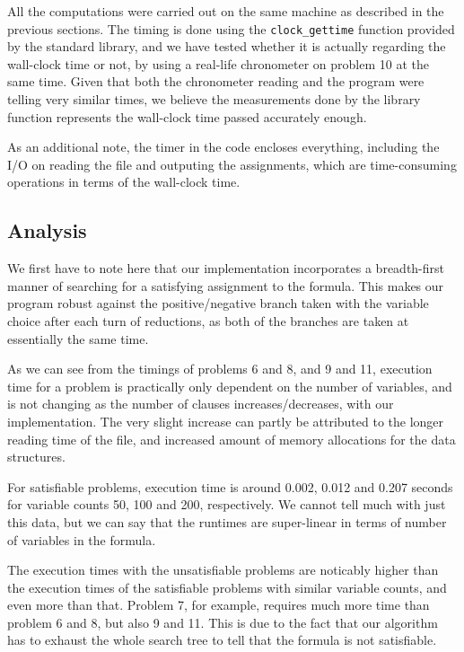 \documentclass{article}
\begin{document}
All the computations were carried out on the same machine as
described in the previous sections. The timing is done using
the \texttt{clock\_gettime} function provided by the standard
library, and we have tested whether it is actually regarding
the wall-clock time or not, by using a real-life chronometer
on problem 10 at the same time. Given that both the chronometer
reading and the program were telling very similar times, we
believe the measurements done by the library function represents
the wall-clock time passed accurately enough.

As an additional note, the timer in the code encloses everything,
including the I/O on reading the file and outputing the assignments,
which are time-consuming operations in terms of the wall-clock time.

\subsection{Analysis}

We first have to note here that our implementation incorporates
a breadth-first manner of searching for a satisfying assignment
to the formula. This makes our program robust against the
positive/negative branch taken with the variable choice
after each turn of reductions, as both of the branches are
taken at essentially the same time.

As we can see from the timings of problems 6 and 8, and 9 and 11,
execution time for a problem is practically only dependent on
the number of variables, and is not changing as the number of clauses
increases/decreases, with our implementation. The very slight
increase can partly be attributed to the longer reading time
of the file, and increased amount of memory allocations for the
data structures.

For satisfiable problems, execution time is around
0.002, 0.012 and 0.207 seconds for variable counts
50, 100 and 200, respectively. We cannot tell much
with just this data, but we can say that the runtimes
are super-linear in terms of number of variables in
the formula.

The execution times with the unsatisfiable problems are noticably
higher than the execution times of the satisfiable problems with
similar variable counts, and even more than that. Problem 7,
for example, requires much more time than problem 6 and 8,
but also 9 and 11. This is due to the fact that our algorithm
has to exhaust the whole search tree to tell that the formula
is not satisfiable.
\end{document}
